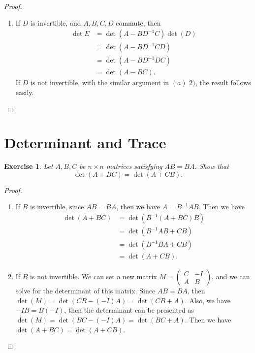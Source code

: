 \documentclass[11pt]{book}
\newtheorem{exercise}{Exercise}[section]
\theoremstyle{definition}
\numberwithin{equation}{chapter}
\begin{document}
\begin{proof}
\begin{enumerate}[label=(\alph*)]
    \item If $D$ is invertible, and $A, B, C, D$ commute, then 
    \begin{align*}
        \det E & = \det (A-BD^{-1}C) \det(D) \\
        & = \det (A-BD^{-1}CD) \\
        & = \det (A-BD^{-1}DC) \\
        & = \det (A-BC).
    \end{align*}
    If $D$ is not invertible, with the similar argument in $(a)\,\,2)$, the result follows easily.
\end{enumerate}
\end{proof}

\medskip

\section{Determinant and Trace}
\begin{exercise}
Let $A,B,C$ be $n\times n$ matrices satisfying $AB=BA$. Show that
$$
\det\left(  A+BC\right)  =\det\left(  A+CB\right).
$$
\end{exercise}
\begin{proof}
~\begin{enumerate}[label=(\alph*)]
    \item If $B$ is invertible, since $AB=BA$, then we have $A=B^{-1}AB$. Then we have
    \begin{align*}
        \det (A+BC) &= \det (B^{-1}(A + BC)B) \\
        & = \det(B^{-1}AB + CB) \\
        & = \det(B^{-1}BA + CB)\\
        & = \det(A + CB).
    \end{align*}
    \item If $B$ is not invertible. We can set a new matrix $M = \begin{pmatrix}
    C & -I \\
    A & B
    \end{pmatrix}$, and we can solve for the determinant of this matrix. Since $AB=BA$, then $\det(M)=\det(CB-(-I)A)=\det(CB+A)$. Also, we have $-IB=B(-I)$, then the determinant can be presented as $\det (M)=\det(BC-(-I)A)=\det(BC+A)$. Then we have $\det(A+BC)=\det(A+CB)$. 
\end{enumerate}
\end{proof}
\end{document}
